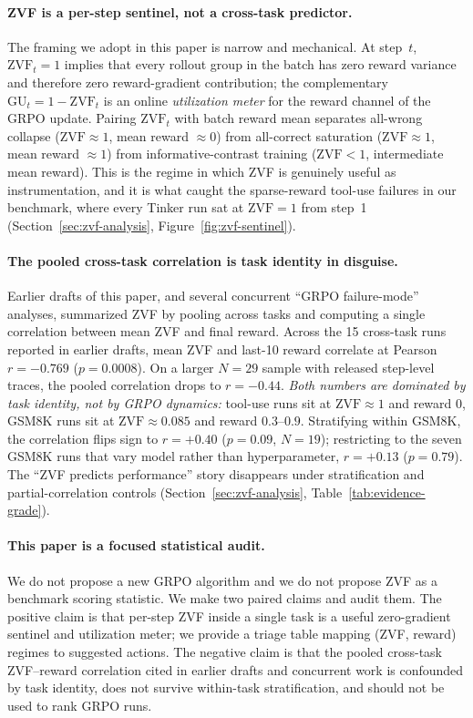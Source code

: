 \documentclass{article}
\begin{document}
\paragraph{ZVF is a per-step sentinel, not a cross-task predictor.}
The framing we adopt in this paper is narrow and mechanical. At step~$t$,
$\mathrm{ZVF}_t = 1$ implies that every rollout group in the batch has zero
reward variance and therefore zero reward-gradient contribution; the
complementary $\mathrm{GU}_t = 1-\mathrm{ZVF}_t$ is an online \emph{utilization
meter} for the reward channel of the GRPO update. Pairing $\mathrm{ZVF}_t$
with batch reward mean separates all-wrong collapse ($\mathrm{ZVF}{\approx}1$,
mean reward $\approx 0$) from all-correct saturation ($\mathrm{ZVF}{\approx}1$,
mean reward $\approx 1$) from informative-contrast training
($\mathrm{ZVF}{<}1$, intermediate mean reward). This is the regime in which
ZVF is genuinely useful as instrumentation, and it is what caught the
sparse-reward tool-use failures in our benchmark, where every Tinker run
sat at $\mathrm{ZVF}{=}1$ from step~1 (Section~\ref{sec:zvf-analysis},
Figure~\ref{fig:zvf-sentinel}).

\paragraph{The pooled cross-task correlation is task identity in disguise.}
Earlier drafts of this paper, and several concurrent ``GRPO failure-mode''
analyses, summarized ZVF by pooling across tasks and computing a single
correlation between mean ZVF and final reward. Across the 15 cross-task
runs reported in earlier drafts, mean ZVF and last-10 reward correlate at
Pearson $r{=}-0.769$ ($p{=}0.0008$). On a larger $N{=}29$ sample with
released step-level traces, the pooled correlation drops to $r{=}-0.44$.
\emph{Both numbers are dominated by task identity, not by GRPO dynamics:}
tool-use runs sit at $\mathrm{ZVF}{\approx}1$ and reward $0$, GSM8K runs
sit at $\mathrm{ZVF}{\approx}0.085$ and reward $0.3$--$0.9$. Stratifying
within GSM8K, the correlation flips sign to $r{=}+0.40$ ($p{=}0.09$,
$N{=}19$); restricting to the seven GSM8K runs that vary model rather than
hyperparameter, $r{=}+0.13$ ($p{=}0.79$). The ``ZVF predicts performance''
story disappears under stratification and partial-correlation controls
(Section~\ref{sec:zvf-analysis}, Table~\ref{tab:evidence-grade}).

\paragraph{This paper is a focused statistical audit.}
We do not propose a new GRPO algorithm and we do not propose ZVF as a
benchmark scoring statistic. We make two paired claims and audit them. The
positive claim is that per-step ZVF inside a single task is a useful
zero-gradient sentinel and utilization meter; we provide a triage table
mapping (ZVF, reward) regimes to suggested actions. The negative claim is
that the pooled cross-task ZVF--reward correlation cited in earlier drafts
and concurrent work is confounded by task identity, does not survive
within-task stratification, and should not be used to rank GRPO runs.
\end{document}
